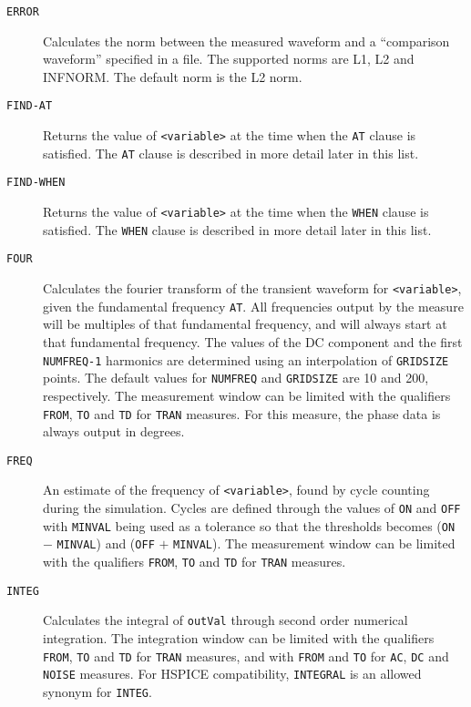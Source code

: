 \begin{Command}
\begin{Arguments}
\begin{description}
  \item[\tt ERROR] Calculates the norm between the measured waveform and a
   ``comparison waveform'' specified in a file.  The supported norms are
    L1, L2 and INFNORM.  The default norm is the L2 norm.

  \item[\tt FIND-AT] Returns the value of {\tt <variable>} at the
    time when the {\tt AT} clause is satisfied.  The {\tt AT}
    clause is described in more detail later in this list.

  \item[\tt FIND-WHEN] Returns the value of {\tt <variable>} at the
    time when the {\tt WHEN} clause is satisfied.  The {\tt WHEN}
    clause is described in more detail later in this list.

  \item[\tt FOUR] Calculates the fourier transform of the transient
    waveform for {\tt <variable>}, given the fundamental frequency
    {\tt AT}.  All frequencies output by the measure will be multiples
    of that fundamental frequency, and will always start at that
    fundamental frequency. The values of the DC component and the
    first {\tt NUMFREQ-1} harmonics are determined using an
    interpolation of {\tt GRIDSIZE} points.  The default values for
    {\tt NUMFREQ} and {\tt GRIDSIZE} are 10 and 200, respectively.
    The measurement window can be limited with the qualifiers {\tt
    FROM}, {\tt TO} and {\tt TD} for {\tt TRAN} measures.  For this
    measure, the phase data is always output in degrees.

  \item[\tt FREQ] An estimate of the frequency of {\tt <variable>},
    found by cycle counting during the simulation.  Cycles are defined
    through the values of {\tt ON} and {\tt OFF} with {\tt MINVAL}
    being used as a tolerance so that the thresholds becomes ({\tt ON}
    $-$ {\tt MINVAL}) and ({\tt OFF} $+$ {\tt MINVAL}). The
    measurement window can be limited with the qualifiers {\tt FROM},
    {\tt TO} and {\tt TD} for {\tt TRAN} measures.

  \item[\tt INTEG] Calculates the integral of {\tt outVal} through
    second order numerical integration.  The integration window can be
    limited with the qualifiers {\tt FROM}, {\tt TO} and {\tt TD} for
    {\tt TRAN} measures, and with {\tt FROM} and {\tt TO} for {\tt AC},
    {\tt DC} and {\tt NOISE} measures.  For HSPICE compatibility,
    {\tt INTEGRAL} is an allowed synonym for {\tt INTEG}.


\end{description}
\end{Arguments}
\end{Command}
